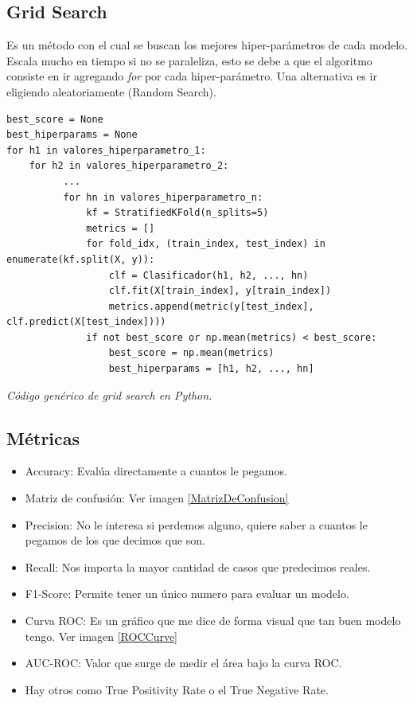 \documentclass[titlepage,a4paper]{article}
\begin{document}
\newpage

\subsection{Grid Search}

Es un método con el cual se buscan los mejores hiper-parámetros de cada modelo. Escala mucho en tiempo si no se paraleliza, esto se debe a que el algoritmo consiste en ir agregando \textit{for} por cada hiper-parámetro. Una alternativa es ir eligiendo aleatoriamente (Random Search).

\begin{verbatim}
best_score = None
best_hiperparams = None
for h1 in valores_hiperparametro_1:
    for h2 in valores_hiperparametro_2:
          ...
          for hn in valores_hiperparametro_n:
              kf = StratifiedKFold(n_splits=5)
              metrics = []
              for fold_idx, (train_index, test_index) in enumerate(kf.split(X, y)):
                  clf = Clasificador(h1, h2, ..., hn)
                  clf.fit(X[train_index], y[train_index])
                  metrics.append(metric(y[test_index], clf.predict(X[test_index])))
              if not best_score or np.mean(metrics) < best_score:
                  best_score = np.mean(metrics)
                  best_hiperparams = [h1, h2, ..., hn]
\end{verbatim}
\begin{center}
   \textit{Código genérico de grid search en Python.}
\end{center}





\subsection{Métricas}
\begin{itemize}
    \item Accuracy: Evalúa directamente a cuantos le pegamos.
    \item Matriz de confusión: Ver imagen \ref{MatrizDeConfusion}
    \item Precision: No le interesa si perdemos alguno, quiere saber a cuantos le pegamos de los que decimos que son. 
    \item Recall: Nos importa la mayor cantidad de casos que predecimos reales.
    \item F1-Score: Permite tener un único numero para evaluar un modelo.
    \item Curva ROC: Es un gráfico que me dice de forma visual que tan buen modelo tengo. Ver imagen \ref{ROCCurve}
    \item AUC-ROC: Valor que surge de medir el área bajo la curva ROC.
    \item Hay otros como True Positivity Rate o el True Negative Rate.
\end{itemize}
\end{document}
